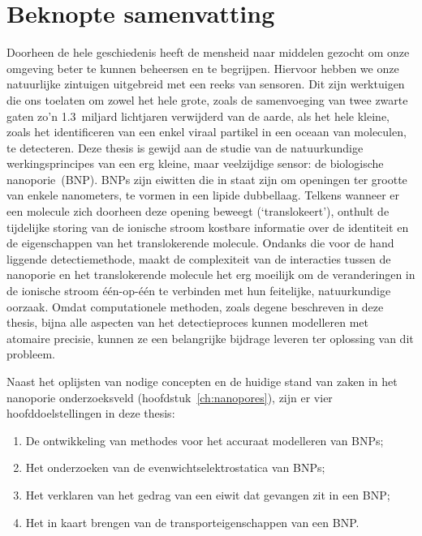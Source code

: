 \chapter{Beknopte samenvatting}
%
\label{ch:abstractnl}
%

Doorheen de hele geschiedenis heeft de mensheid naar middelen gezocht om onze omgeving beter te kunnen
beheersen en te begrijpen. Hiervoor hebben we onze natuurlijke zintuigen uitgebreid met een reeks van
sensoren. Dit zijn werktuigen die ons toelaten om zowel het hele grote, zoals de samenvoeging van twee zwarte
gaten zo'n \num{1.3}~miljard lichtjaren verwijderd van de aarde, als het hele kleine, zoals het identificeren
van een enkel viraal partikel in een oceaan van moleculen, te detecteren. Deze thesis is gewijd aan de studie
van de natuurkundige werkingsprincipes van een erg kleine, maar veelzijdige sensor: de biologische
nanoporie~(BNP). BNPs zijn eiwitten die in staat zijn om openingen ter grootte van enkele nanometers, te
vormen in een lipide dubbellaag. Telkens wanneer er een molecule zich doorheen deze opening beweegt
(`translokeert'), onthult de tijdelijke storing van de ionische stroom kostbare informatie over de identiteit
en de eigenschappen van het translokerende molecule. Ondanks die voor de hand liggende detectiemethode, maakt
de complexiteit van de interacties tussen de nanoporie en het translokerende molecule het erg moeilijk om de
veranderingen in de ionische stroom \'{e}\'{e}n-op-\'{e}\'{e}n te verbinden met hun feitelijke, natuurkundige
oorzaak. Omdat computationele methoden, zoals degene beschreven in deze thesis, bijna alle aspecten van het
detectieproces kunnen modelleren met atomaire precisie, kunnen ze een belangrijke bijdrage leveren ter
oplossing van dit probleem.

Naast het oplijsten van nodige concepten en de huidige stand van zaken in het nanoporie onderzoeksveld
(hoofdstuk~\ref{ch:nanopores}), zijn er vier hoofddoelstellingen in deze thesis:
%
\begin{enumerate}
  \item De ontwikkeling van methodes voor het accuraat modelleren van BNPs;
  \item Het onderzoeken van de evenwichtselektrostatica van BNPs;  
  \item Het verklaren van het gedrag van een eiwit dat gevangen zit in een BNP;
  \item Het in kaart brengen van de transporteigenschappen van een BNP.
\end{enumerate}
%

